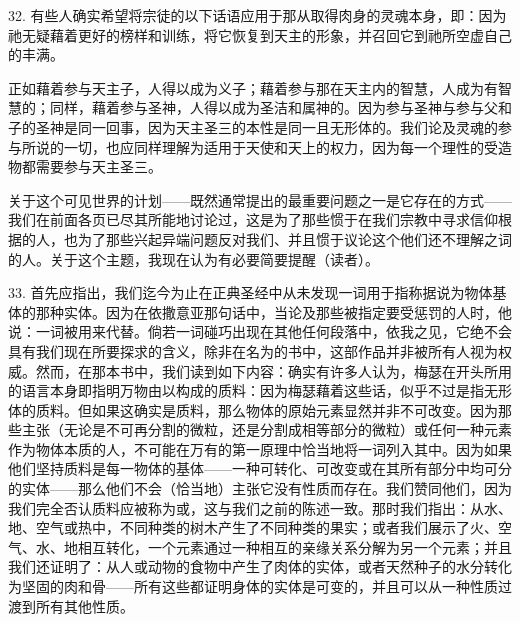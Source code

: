 32. 有些人确实希望将宗徒的以下话语应用于那从取得肉身的灵魂本身，即：因为祂无疑藉着更好的榜样和训练，将它恢复到天主的形象，并召回它到祂所空虚自己的丰满。\par

正如藉着参与天主子，人得以成为义子；藉着参与那在天主内的智慧，人成为有智慧的；同样，藉着参与圣神，人得以成为圣洁和属神的。因为参与圣神与参与父和子的圣神是同一回事，因为天主圣三的本性是同一且无形体的。我们论及灵魂的参与所说的一切，也应同样理解为适用于天使和天上的权力，因为每一个理性的受造物都需要参与天主圣三。\par

关于这个可见世界的计划——既然通常提出的最重要问题之一是它存在的方式——我们在前面各页已尽其所能地讨论过，这是为了那些惯于在我们宗教中寻求信仰根据的人，也为了那些兴起异端问题反对我们、并且惯于议论这个他们还不理解之词的人。关于这个主题，我现在认为有必要简要提醒（读者）。\par

33. 首先应指出，我们迄今为止在正典圣经中从未发现一词用于指称据说为物体基体的那种实体。因为在依撒意亚那句话中，当论及那些被指定要受惩罚的人时，他说：一词被用来代替。倘若一词碰巧出现在其他任何段落中，依我之见，它绝不会具有我们现在所要探求的含义，除非在名为的书中，这部作品并非被所有人视为权威。然而，在那本书中，我们读到如下内容：确实有许多人认为，梅瑟在开头所用的语言本身即指明万物由以构成的质料：因为梅瑟藉着这些话，似乎不过是指无形体的质料。但如果这确实是质料，那么物体的原始元素显然并非不可改变。因为那些主张（无论是不可再分割的微粒，还是分割成相等部分的微粒）或任何一种元素作为物体本质的人，不可能在万有的第一原理中恰当地将一词列入其中。因为如果他们坚持质料是每一物体的基体——一种可转化、可改变或在其所有部分中均可分的实体——那么他们不会（恰当地）主张它没有性质而存在。我们赞同他们，因为我们完全否认质料应被称为或，这与我们之前的陈述一致。那时我们指出：从水、地、空气或热中，不同种类的树木产生了不同种类的果实；或者我们展示了火、空气、水、地相互转化，一个元素通过一种相互的亲缘关系分解为另一个元素；并且我们还证明了：从人或动物的食物中产生了肉体的实体，或者天然种子的水分转化为坚固的肉和骨——所有这些都证明身体的实体是可变的，并且可以从一种性质过渡到所有其他性质。\par


